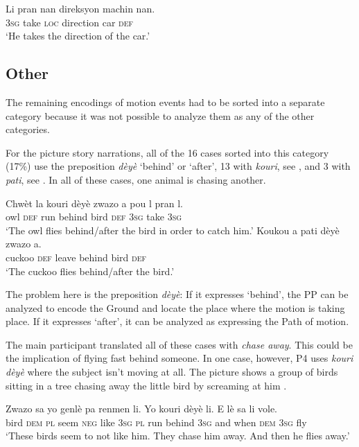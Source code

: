 \documentclass[output=paper,colorlinks,citecolor=brown]{langscibook}
\begin{document}
\ea\label{ex:3:68}
\gll Li pran nan direksyon machin nan. \\
     \textsc{3sg} take \textsc{loc} direction car \textsc{def}\\
\glt ‘He takes the direction of the car.’
\z

\subsection{Other}

The remaining encodings of motion events had to be sorted into a separate category because it was not possible to analyze them as any of the other categories.

For the picture story narrations, all of the 16 cases sorted into this category (17\%) use the preposition \emph{dèyè} ‘behind’ or ‘after’, 13 with \emph{kouri}, see , and 3 with \emph{pati}, see . In all of these cases, one animal is chasing another.

\ea\label{ex:3:69}
\gll Chwèt la kouri dèyè zwazo  a pou l pran l.\\
     owl \textsc{def} run behind bird \textsc{def} \textsc{3sg} take \textsc{3sg}\\
\glt ‘The owl flies behind/after the bird in order to catch him.’
\ex\label{ex:3:70}
\gll Koukou a pati dèyè zwazo a. \\
     cuckoo \textsc{def} leave behind bird \textsc{def}\\
\glt ‘The cuckoo flies behind/after the bird.’
\z

The problem here is the preposition \emph{dèyè}: If it expresses ‘behind’, the PP can be analyzed to encode the Ground and locate the place where the motion is taking place. If it expresses ‘after’, it can be analyzed as expressing the Path of motion.

The main participant translated all of these cases with \emph{chase away}. This could be the implication of flying fast behind someone. In one case, however, P4 uses \emph{kouri dèyè} where the subject isn’t moving at all. The picture shows a group of birds sitting in a tree chasing away the little bird by screaming at him .

\ea\label{ex:3:71}
\gll Zwazo sa yo genlè pa renmen  li. Yo kouri dèyè  li. E lè sa li vole.\\
     bird \textsc{dem} \textsc{pl} seem \textsc{neg} like  \textsc{3sg} \textsc{pl} run behind  \textsc{3sg} and when \textsc{dem} \textsc{3sg} fly\\        
\glt ‘These birds seem to not like him. They chase him away. And then he flies away.’
\z
\end{document}
